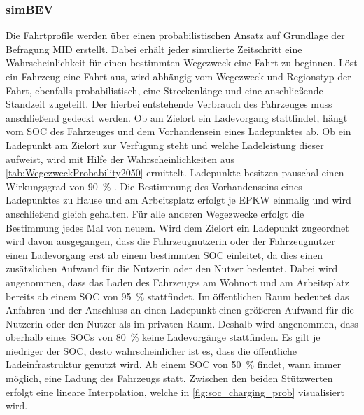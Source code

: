 


\subsubsection{simBEV}


Die Fahrtprofile werden über einen probabilistischen Ansatz auf Grundlage der Befragung \gls{MID} erstellt.
Dabei erhält jeder simulierte Zeitschritt eine Wahrscheinlichkeit für einen bestimmten Wegezweck eine Fahrt zu beginnen.
Löst ein Fahrzeug eine Fahrt aus, wird abhängig vom Wegezweck und Regionstyp der Fahrt, ebenfalls probabilistisch, eine Streckenlänge und eine anschließende Standzeit zugeteilt.
Der hierbei entstehende Verbrauch des Fahrzeuges muss anschließend gedeckt werden.
Ob am Zielort ein Ladevorgang stattfindet, hängt vom \gls{SOC} des Fahrzeuges und dem Vorhandensein eines Ladepunktes ab.
Ob ein Ladepunkt am Zielort zur Verfügung steht und welche Ladeleistung dieser aufweist, wird mit Hilfe der Wahrscheinlichkeiten aus \autoref{tab:WegezweckProbability2050} ermittelt.
Ladepunkte besitzen pauschal einen Wirkungsgrad von \SI{90}{\percent} \cite{EliaGroup2020}.
Die Bestimmung des Vorhandenseins eines Ladepunktes zu Hause und am Arbeitsplatz erfolgt je \gls{EPKW} einmalig und wird anschließend gleich gehalten.
Für alle anderen Wegezwecke erfolgt die Bestimmung jedes Mal von neuem.
Wird dem Zielort ein Ladepunkt zugeordnet wird davon ausgegangen, dass die Fahrzeugnutzerin oder der Fahrzeugnutzer einen Ladevorgang erst ab einem bestimmten \gls{SOC} einleitet, da dies einen zusätzlichen Aufwand für die Nutzerin oder den Nutzer bedeutet.
Dabei wird angenommen, dass das Laden des Fahrzeuges am Wohnort und am Arbeitsplatz bereits ab einem \gls{SOC} von \SI{95}{\percent} stattfindet.
Im öffentlichen Raum bedeutet das Anfahren und der Anschluss an einen Ladepunkt einen größeren Aufwand für die Nutzerin oder den Nutzer als im privaten Raum.
Deshalb wird angenommen, dass oberhalb eines \glspl{SOC} von \SI{80}{\percent} keine Ladevorgänge stattfinden.
Es gilt je niedriger der \gls{SOC}, desto wahrscheinlicher ist es, dass die öffentliche Ladeinfrastruktur genutzt wird.
Ab einem \gls{SOC} von \SI{50}{\percent} findet, wann immer möglich, eine Ladung des Fahrzeugs statt.
Zwischen den beiden Stützwerten erfolgt eine lineare Interpolation, welche in \autoref{fig:soc_charging_prob} visualisiert wird.

